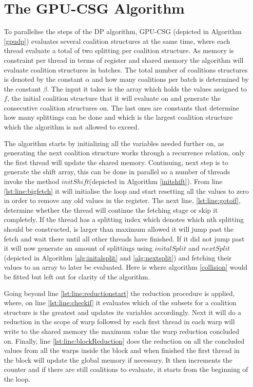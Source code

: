 \documentclass{llncs}
\begin{document}
\section{The GPU-CSG Algorithm}\label{algorithm}
To parallelise the steps of the DP algorithm, GPU-CSG (depicted in Algorithm \ref{gpudp}) evaluates several coalition structures at the same time, where each thread evaluate a total of two splitting per coalition structure.  As memory is constraint per thread in terms of register and shared memory the algorithm will evaluate coalition structures in batches. The total number of coalitions structures is denoted by the constant $\alpha$  and how many coalitions per batch is determined by the constant $\beta$. The input it takes is the array which holds the values assigned to $f$, the initial coalition structure that it will evaluate on and generate the consecutive coalition structures on. The last ones are constants that determine how many splittings can be done  and which is the largest coalition structure which the algorithm is not allowed to exceed.

The algorithm starts by initializing all the variables needed further on, as generating the next coalition structure works through a recurrence relation,  only the first thread will update the shared memory. Continuing, next step is to generate the shift array,  this can be done in parallel so a number of threads invoke the method $initShift$(depicted in Algorithm \ref{initshift}). From line \ref{lst:line:bigfetch} it will initialise the loop and start resetting all the values to zero  in order to remove any old values in the register. The next line, \ref{lst:line:gotoif}, determine whether the thread will continue the fetching stage or skip it completely. If the thread has a splitting index which denotes which nth splitting should be constructed,  is larger than maximum allowed it will jump past the fetch and wait there until all other threads have finished. If it did not jump past it will now generate an amount of splittings using $initalSplit$ and $nextSplit$ (depicted in Algorithm \ref{alg:initalsplit} and \ref{alg:nextsplit}) and fetching their values to an array to later be evaluated. Here is where algorithm \ref{collision} would be fitted but left out for clarity of the algorithm.

Going beyond line \ref{lst:line:reductionstart} the reduction procedure is applied, where,  
on line \ref{lst:line:checkif} it evaluates which of the subsets for a coalition structure is the greatest and updates its variables accordingly. Next it will do a reduction in the scope of warp followed by each first thread in each warp will write to the shared memory  the maximum value the warp reduction concluded on. Finally, line \ref{lst:line:blockReduction} does the reduction on all the concluded values
from all the warps inside the block and when finished the first thread in the block will update the global memory if necessary. It then increments the counter and if there are still coalitions to evaluate, it starts from the beginning of the loop.
\end{document}

